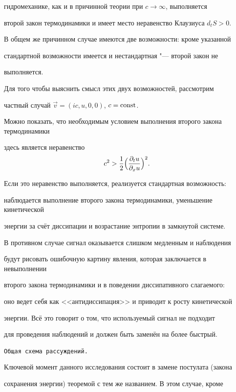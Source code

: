 гидромеханике, как и в причинной теории при $c\rightarrow\infty$, выполняется

второй закон термодинамики и имеет место неравенство Клаузиуса $d_{t}S>0$.

В общем же причинном случае имеются две возможности: кроме указанной

стандартной возможности имеется и нестандартная "---  второй закон не

выполняется. 



Для того чтобы выяснить смысл этих двух возможностей, рассмотрим

частный случай $\vec{v}=\left(ic,u,0,0\right)$, $c=\textnormal{const}$.

Можно показать, что необходимым условием выполнения второго закона термодинамики

здесь является неравенство $$c^{2}>\frac{1}{2}\Bigl(\frac{\partial_{t}u}{\partial_{x}u}\Bigr)^{2}.$$

Если это неравенство выполняется, реализуется стандартная возможность:

наблюдается выполнение второго закона термодинамики, уменьшение кинетической

энергии за счёт диссипации и возрастание энтропии в замкнутой системе.

В противном случае сигнал оказывается слишком медленным и наблюдения

будут рисовать ошибочную картину явления, которая заключается в невыполнении

второго закона термодинамики и в поведении диссипативного слагаемого:

оно ведет себя как <<антидиссипация>> и приводит к росту кинетической

энергии. Всё это говорит о том, что используемый сигнал не подходит

для проведения наблюдений и должен быть заменён на более быстрый.



\pagebreak






{\tt Общая схема рассуждений.}

Ключевой момент данного исследования состоит в замене постулата (закона

сохранения энергии) теоремой с тем же названием. В этом случае, кроме

